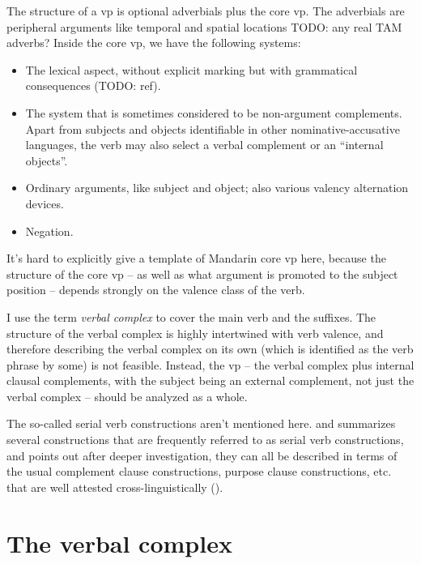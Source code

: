 \documentclass[UTF8, a4paper, oneside, scheme=plain, 12pt]{ctexrep}
\newcommand*{\citesec}[1]{\S~{#1}}
\newcommand*{\term}[1]{\emph{#1}}
\begin{document}
The structure of a \acs{vp} is 
optional adverbials
plus the core \acs{vp}.
The adverbials are peripheral arguments like 
temporal and spatial locations TODO: any real TAM adverbs? 
Inside the core \acs{vp},
we have the following systems:
\begin{itemize}
    \item The lexical aspect, without explicit marking but with grammatical consequences (TODO: ref).
    \item The system that is sometimes considered to be non-argument complements.
    Apart from subjects and objects 
    identifiable in other nominative-accusative languages,
    the verb may also select 
    a verbal complement or an ``internal objects''.
    \item Ordinary arguments, like subject and object; 
        also various valency alternation devices.
    \item Negation. 
\end{itemize} 

It's hard to explicitly give a template of Mandarin core \acs{vp} here,
because the structure of the core \acs{vp} 
-- as well as what argument is promoted to the subject position -- depends
strongly on the valence class of the verb.


I use the term \term{verbal complex} to cover 
the main verb and the suffixes.
The structure of the verbal complex is highly intertwined 
with verb valence, 
and therefore describing the verbal complex on its own 
(which is identified as the verb phrase by some)
is not feasible.
Instead, the \acs{vp} 
-- the verbal complex plus internal clausal complements, 
with the subject being an external complement,
not just the verbal complex --
should be analyzed as a whole.

The so-called serial verb constructions aren't mentioned here.
\citet{paul2008serial} and \citet[\citesec{9.4}]{deng2010formal} 
summarizes several constructions that are
frequently referred to as serial verb constructions,
and points out after deeper investigation,
they can all be described in terms of the usual complement clause constructions,
purpose clause constructions, etc. 
that are well attested cross-linguistically ().



\section{The verbal complex}
\end{document}
